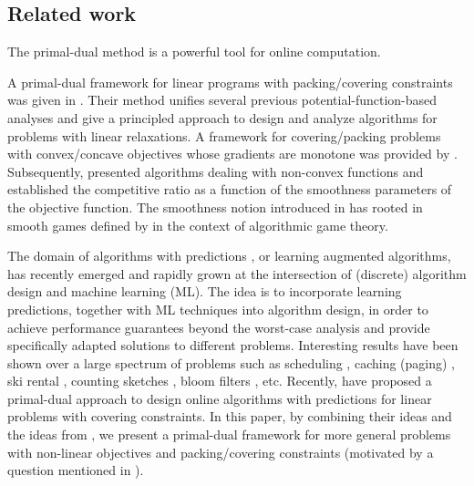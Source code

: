 
\subsection{Related work}
The primal-dual method is a powerful tool for online computation.

A primal-dual framework for linear programs with packing/covering constraints was given in \cite{BuchbinderNaor09:The-Design-of-Competitive}.
Their method unifies several previous potential-function-based analyses and give a 
principled approach to design and analyze algorithms for problems with linear relaxations. 
A framework for covering/packing problems with 
convex/concave objectives whose gradients are monotone was provided by \cite{AzarBuchbinder16:Online-Algorithms}. Subsequently, 
\cite{Thang20:Online-Primal-Dual} presented algorithms dealing with non-convex functions 
and established the competitive ratio as a function of the smoothness
parameters of the objective function. The smoothness notion introduced in \cite{Thang20:Online-Primal-Dual} has rooted in smooth games 
defined by \cite{Roughgarden15:Intrinsic-Robustness} in the context of algorithmic game theory.

The domain of algorithms with predictions \cite{MitzenmacherVassilvitskii20:Beyond-the-Worst-Case}, 
or learning augmented algorithms, has recently emerged
and rapidly grown at the intersection of (discrete) algorithm design and machine learning (ML). The idea is to incorporate learning predictions,
together with ML techniques into algorithm design, in order to achieve performance guarantees beyond 
the worst-case analysis and provide specifically adapted solutions to different problems. 
Interesting results have been shown over a large spectrum of problems such as
 scheduling \cite{LattanziLavastida20:Online-scheduling,Mitzenmacher20:Scheduling-with}, 
 caching (paging) \cite{LykourisVassilvtiskii18:Competitive-caching,Rohatgi20:Near-optimal-bounds,AntoniadisCoester20:Online-metric}, 
 ski rental \cite{GollapudiPanigrahi19:Online-algorithms,KumarPurohit18:Improving-online,AngelopoulosDurr20:Online-Computation}, 
 counting sketches \cite{HsuIndyk19:Learning-Based-Frequency}, 
 bloom filters \cite{KraskaBeutel18:The-case-for-learned,Mitzenmacher18:A-model-for-learned}, etc. 
 Recently, \citet{BamasMaggiori20:The-Primal-Dual-method} have proposed a primal-dual approach to design online algorithms with predictions for linear problems with covering constraints. In this paper, by combining their ideas and the ideas from 
 \cite{BuchbinderNaor09:The-Design-of-Competitive,AzarBuchbinder16:Online-Algorithms,Thang20:Online-Primal-Dual},
 we present a primal-dual framework for more general problems with non-linear objectives and 
 packing/covering constraints (motivated by a question mentioned in \cite{BamasMaggiori20:The-Primal-Dual-method}). 
 
